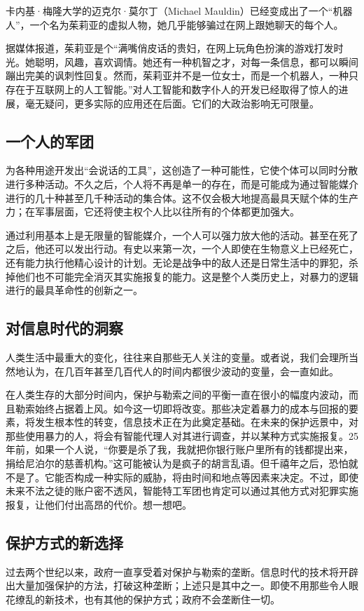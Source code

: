 卡内基·梅隆大学的迈克尔·莫尔丁（Michael Mauldin）已经变成出了一个“机器人”，一个名为茱莉亚的虚拟人物，她几乎能够骗过在网上跟她聊天的每个人。

据媒体报道，茱莉亚是个“满嘴俏皮话的贵妇，在网上玩角色扮演的游戏打发时光。她聪明，风趣，喜欢调情。她还有一种机智之才，对每一条信息，都可以瞬间蹦出完美的讽刺性回复。然而，茱莉亚并不是一位女士，而是一个机器人，一种只存在于互联网上的人工智能。”对人工智能和数字仆人的开发已经取得了惊人的进展，毫无疑问，更多实际的应用还在后面。它们的大政治影响无可限量。

\subsection{一个人的军团}
为各种用途开发出“会说话的工具”，这创造了一种可能性，它使个体可以同时分散进行多种活动。不久之后，个人将不再是单一的存在，而是可能成为通过智能媒介进行的几十种甚至几千种活动的集合体。这不仅会极大地提高最具天赋个体的生产力；在军事层面，它还将使主权个人比以往所有的个体都更加强大。

通过利用基本上是无限量的智能媒介，一个人可以强力放大他的活动。甚至在死了之后，他还可以发出行动。有史以来第一次，一个人即使在生物意义上已经死亡，还有能力执行他精心设计的计划。无论是战争中的敌人还是日常生活中的罪犯，杀掉他们也不可能完全消灭其实施报复的能力。这是整个人类历史上，对暴力的逻辑进行的最具革命性的创新之一。

\subsection{对信息时代的洞察}
人类生活中最重大的变化，往往来自那些无人关注的变量。或者说，我们会理所当然地认为，在几百年甚至几百代人的时间内都很少波动的变量，会一直如此。

在人类生存的大部分时间内，保护与勒索之间的平衡一直在很小的幅度内波动，而且勒索始终占据着上风。如今这一切即将改变。那些决定着暴力的成本与回报的要素，将发生根本性的转变，信息技术正在为此奠定基础。在未来的保护远景中，对那些使用暴力的人，将会有智能代理人对其进行调查，并以某种方式实施报复。25 年前，如果一个人说，“你要是杀了我，我就把你银行账户里所有的钱都提出来，捐给尼泊尔的慈善机构。”这可能被认为是疯子的胡言乱语。但千禧年之后，恐怕就不是了。它能否构成一种实际的威胁，将由时间和地点等因素来决定。不过，即使未来不法之徒的账户密不透风，智能特工军团也肯定可以通过其他方式对犯罪实施报复，让他们付出高昂的代价。想一想吧。

\subsection{保护方式的新选择}
过去两个世纪以来，政府一直享受着对保护与勒索的垄断。信息时代的技术将开辟出大量加强保护的方法，打破这种垄断；上述只是其中之一。即使不用那些令人眼花缭乱的新技术，也有其他的保护方式；政府不会垄断住一切。

